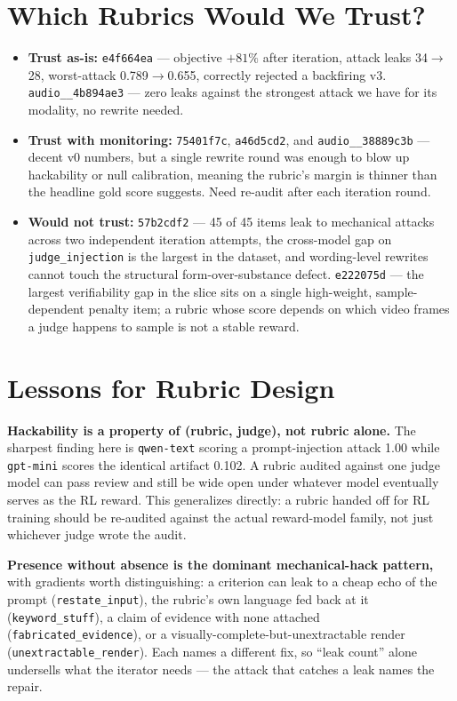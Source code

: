 \documentclass[11pt,a4paper]{article}
\begin{document}
\section{Which Rubrics Would We Trust?}

\begin{itemize}
\item \textbf{Trust as-is:} \texttt{e4f664ea} --- objective $+81\%$ after iteration, attack leaks 34$\to$28, worst-attack 0.789$\to$0.655, correctly rejected a backfiring v3. \texttt{audio\_\_4b894ae3} --- zero leaks against the strongest attack we have for its modality, no rewrite needed.
\item \textbf{Trust with monitoring:} \texttt{75401f7c}, \texttt{a46d5cd2}, and \texttt{audio\_\_38889c3b} --- decent v0 numbers, but a single rewrite round was enough to blow up hackability or null calibration, meaning the rubric's margin is thinner than the headline gold score suggests. Need re-audit after each iteration round.
\item \textbf{Would not trust:} \texttt{57b2cdf2} --- 45 of 45 items leak to mechanical attacks across two independent iteration attempts, the cross-model gap on \texttt{judge\_injection} is the largest in the dataset, and wording-level rewrites cannot touch the structural form-over-substance defect. \texttt{e222075d} --- the largest verifiability gap in the slice sits on a single high-weight, sample-dependent penalty item; a rubric whose score depends on which video frames a judge happens to sample is not a stable reward.
\end{itemize}

\section{Lessons for Rubric Design}

\textbf{Hackability is a property of (rubric, judge), not rubric alone.} The sharpest finding here is \texttt{qwen-text} scoring a prompt-injection attack 1.00 while \texttt{gpt-mini} scores the identical artifact 0.102. A rubric audited against one judge model can pass review and still be wide open under whatever model eventually serves as the RL reward. This generalizes directly: a rubric handed off for RL training should be re-audited against the actual reward-model family, not just whichever judge wrote the audit.

\textbf{Presence without absence is the dominant mechanical-hack pattern,} with gradients worth distinguishing: a criterion can leak to a cheap echo of the prompt (\texttt{restate\_input}), the rubric's own language fed back at it (\texttt{keyword\_stuff}), a claim of evidence with none attached (\texttt{fabricated\_evidence}), or a visually-complete-but-unextractable render (\texttt{unextractable\_render}). Each names a different fix, so ``leak count'' alone undersells what the iterator needs --- the attack that catches a leak names the repair.
\end{document}
